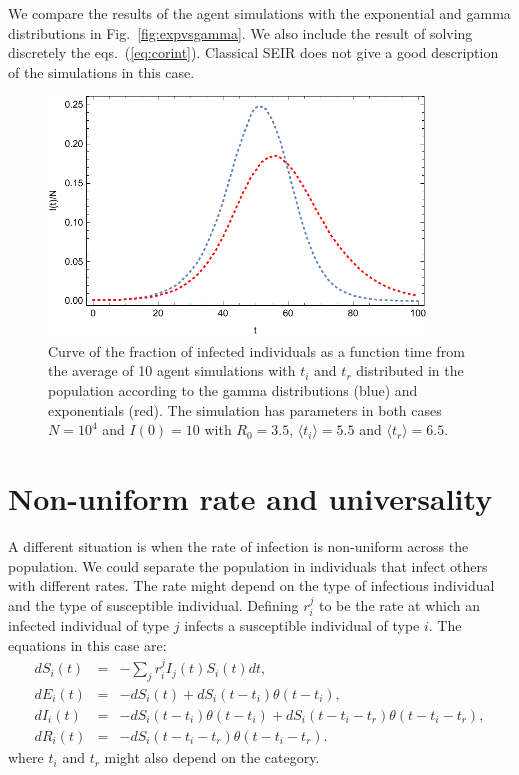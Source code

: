 \documentclass[a4paper,oneside,11pt]{article}
\begin{document}
We compare the results of the agent simulations with the exponential and gamma distributions in Fig.~\ref{fig:expvsgamma}. We also include the result of solving discretely the eqs.~(\ref{eq:corint}). Classical SEIR does not give a good description of the simulations in this case. 
\begin{figure}[h!]
  \centering
  \includegraphics[width=10cm]{expvsgamma.pdf}
  \caption{ Curve of the fraction of infected individuals as a function time from the average of 10 agent simulations with $t_i$ and $t_r$ distributed in the population according to the gamma distributions (blue) and exponentials (red). The simulation has parameters in both cases $N=10^4$ and $I(0)=10$ with $R_0=3.5$, $\langle t_i\rangle=5.5$ and $\langle t_r\rangle=6.5$.  }
  \label{fig:exp}
   \end{figure}  
   
\section{Non-uniform rate and universality }
\label{sec:r}
A different situation is when the rate of infection is non-uniform across the population. We could separate the population in individuals that infect others with different rates. The rate might depend on the type of infectious individual and the type of susceptible individual. Defining $r^{j}_{i}$ to be the rate at which an infected individual of type $j$ infects a susceptible individual of type $i$. The equations in this case are:
\begin{eqnarray}
d S_i(t) &=& - \sum_j r^j_{i}  I_j(t) S_i(t) dt, \nonumber\\
d E_i(t) &=& -d S_i(t) + d S_i(t-t_i) \theta(t-t_i) ,\nonumber\\
d I_i(t) &=& -d S_i(t-t_i) \theta(t-t_i)+ d S_i(t-t_i-t_r) \theta(t-t_i-t_r),\nonumber\\
d R_i(t) &=& - d S_i(t - t_i - t_r) \theta(t-t_i-t_r).\nonumber
\end{eqnarray}
where $t_i$ and $t_r$ might also depend on the category.
\end{document}
